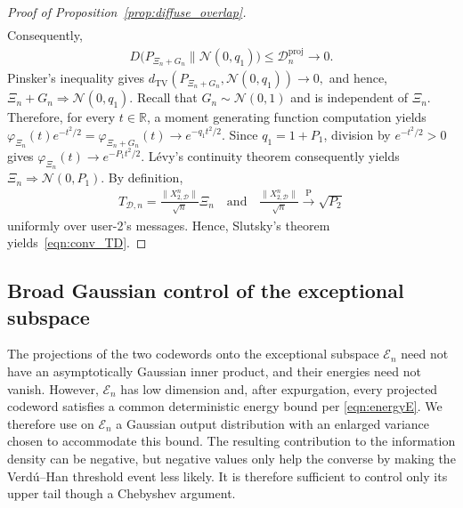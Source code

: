 \documentclass[11pt,onecolumn]{IEEEtran}
\newcommand{\calD}{\mathcal{D}}
\newcommand{\calE}{\mathcal{E}}
\newcommand{\calN}{\mathcal{N}}
\newcommand{\bbR}{\mathbb{R}}
\begin{document}
\begin{proof}[Proof of Proposition~\ref{prop:diffuse_overlap}]
\begin{align}
\end{align}
Consequently, 
\begin{align}
    D\big(P_{\Xi_n+G_n}\| \calN(0,q_1) \big)\le \calD_n^{\mathrm{proj}}\to0.
\end{align}
Pinsker's inequality gives $d_{\mathrm{TV}}\left(P_{\Xi_n+G_n},\calN(0,q_1) \right)\to0,$ and hence, $ \Xi_n+G_n\Rightarrow\calN(0,q_1)$.
Recall that $G_n\sim\calN(0,1)$ and is independent of $\Xi_n$.
Therefore, for every $t\in\bbR$, a moment generating function computation yields $\varphi_{\Xi_n}(t)e^{-t^2/2}
=\varphi_{\Xi_n+G_n}(t)
\to e^{-q_1t^2/2}.$ 
Since $q_1=1+P_1$, division by $e^{-t^2/2}>0$ gives
$\varphi_{\Xi_n}(t)\to e^{-P_1t^2/2}.$  L\'evy's continuity theorem consequently yields
$\Xi_n\Rightarrow\calN(0,P_1)$.
By definition, 
\begin{align}
    T_{\calD,n}= \frac{\|X_{2,\calD}^n \|}{\sqrt{n}} \Xi_n  \quad\mbox{and}\quad\frac{\|X_{2,\calD}^n \|}{\sqrt{n}} \xrightarrow{\mathrm P} \sqrt{P_2}
\end{align}
uniformly over user-2's messages. Hence, Slutsky's theorem yields~\eqref{eqn:conv_TD}. 
\end{proof}



\subsection{Broad Gaussian control of the exceptional subspace} \label{sec:broad}
The projections of the two codewords onto the exceptional subspace $\calE_n$ need not have an asymptotically Gaussian inner product, and their energies need not vanish.
However, $\calE_n$ has low dimension and, after expurgation, every projected
codeword satisfies a common deterministic energy bound per \eqref{eqn:energyE}. We therefore use on $\calE_n$ a Gaussian output distribution with an enlarged variance chosen
to accommodate this bound. The resulting contribution to the information
density can be negative, but negative values only help the converse by making
the Verd\'u--Han threshold event less likely. It is therefore sufficient to
control only its upper tail though a Chebyshev argument.
\end{document}

